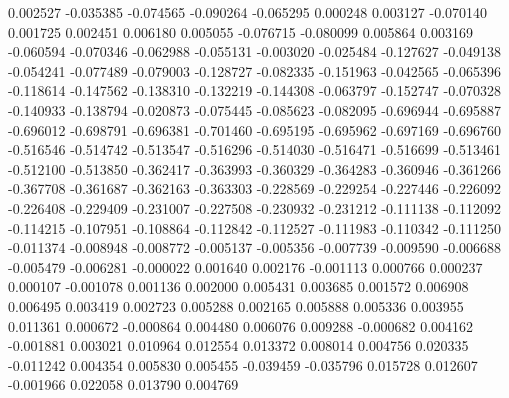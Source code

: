 0.002527
-0.035385
-0.074565
-0.090264
-0.065295
0.000248
0.003127
-0.070140
0.001725
0.002451
0.006180
0.005055
-0.076715
-0.080099
0.005864
0.003169
-0.060594
-0.070346
-0.062988
-0.055131
-0.003020
-0.025484
-0.127627
-0.049138
-0.054241
-0.077489
-0.079003
-0.128727
-0.082335
-0.151963
-0.042565
-0.065396
-0.118614
-0.147562
-0.138310
-0.132219
-0.144308
-0.063797
-0.152747
-0.070328
-0.140933
-0.138794
-0.020873
-0.075445
-0.085623
-0.082095
-0.696944
-0.695887
-0.696012
-0.698791
-0.696381
-0.701460
-0.695195
-0.695962
-0.697169
-0.696760
-0.516546
-0.514742
-0.513547
-0.516296
-0.514030
-0.516471
-0.516699
-0.513461
-0.512100
-0.513850
-0.362417
-0.363993
-0.360329
-0.364283
-0.360946
-0.361266
-0.367708
-0.361687
-0.362163
-0.363303
-0.228569
-0.229254
-0.227446
-0.226092
-0.226408
-0.229409
-0.231007
-0.227508
-0.230932
-0.231212
-0.111138
-0.112092
-0.114215
-0.107951
-0.108864
-0.112842
-0.112527
-0.111983
-0.110342
-0.111250
-0.011374
-0.008948
-0.008772
-0.005137
-0.005356
-0.007739
-0.009590
-0.006688
-0.005479
-0.006281
-0.000022
0.001640
0.002176
-0.001113
0.000766
0.000237
0.000107
-0.001078
0.001136
0.002000
0.005431
0.003685
0.001572
0.006908
0.006495
0.003419
0.002723
0.005288
0.002165
0.005888
0.005336
0.003955
0.011361
0.000672
-0.000864
0.004480
0.006076
0.009288
-0.000682
0.004162
-0.001881
0.003021
0.010964
0.012554
0.013372
0.008014
0.004756
0.020335
-0.011242
0.004354
0.005830
0.005455
-0.039459
-0.035796
0.015728
0.012607
-0.001966
0.022058
0.013790
0.004769

